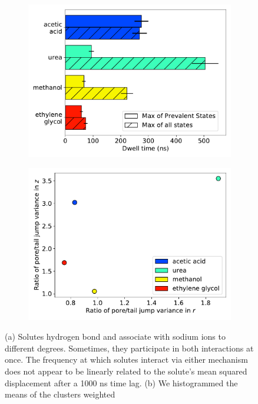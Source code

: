 \documentclass{article}
\begin{document}
\begin{figure}
\begin{subfigure}{0.45\textwidth}
  \includegraphics[width=\textwidth]{dwell_time_summary.pdf}
  \caption{}\label{fig:dwell_time_summary}
  \end{subfigure}
  \begin{subfigure}{0.45\textwidth}
  \includegraphics[width=\textwidth]{cov_summary.pdf}
  \caption{}\label{fig:cov_summary}
  \end{subfigure}
  \caption{(a) Solutes hydrogen bond and associate with sodium ions
  to different degrees. Sometimes, they participate in both interactions at
  once. The frequency at which solutes interact via either mechanism does
  not appear to be linearly related to the solute's mean squared displacement
  after a 1000 ns time lag. (b) We histogrammed the means of the clusters weighted
}
\end{figure}
\end{document}
